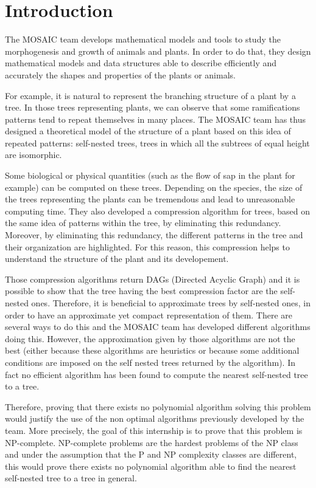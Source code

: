 \section*{Introduction}
%

The MOSAIC team develops mathematical models and tools to study the
morphogenesis and growth of animals and plants. In order to do that,
they design mathematical models and data structures able to describe
efficiently and accurately the shapes and properties of the plants or
animals.

For example, it is natural to represent the branching structure of a
plant by a tree. In those trees representing plants, we can observe
that some ramifications patterns tend to repeat themselves in many
places. The MOSAIC team has thus designed a theoretical model of the
structure of a plant based on this idea of repeated patterns:
self-nested trees, trees in which all the subtrees of equal height are
isomorphic.

Some biological or physical quantities (such as the flow of sap in the
plant for example) can be computed on these trees. Depending on the
species, the size of the trees representing the plants can be
tremendous and lead to unreasonable computing time. They also
developed a compression algorithm for trees, based on the same idea of
patterns within the tree, by eliminating this redundancy. Moreover, by
eliminating this redundancy, the different patterns in the tree and
their organization are highlighted. For this reason, this compression
helps to understand the structure of the plant and its developement.

Those compression algorithms return DAGs (Directed Acyclic Graph) and
it is possible to show that the tree having the best compression
factor are the self-nested ones. Therefore, it is beneficial to
approximate trees by self-nested ones, in order to have an approximate
yet compact representation of them. There are several ways to do this
and the MOSAIC team has developed different algorithms doing
this. However, the approximation given by those algorithms are not the
best (either because these algorithms are heuristics or because some
additional conditions are imposed on the self nested trees returned by
the algorithm). In fact no efficient algorithm has been found to
compute the nearest self-nested tree to a tree.

Therefore, proving that there exists no polynomial algorithm solving
this problem would justify the use of the non optimal algorithms
previously developed by the team. More precisely, the goal of this
internship is to prove that this problem is NP-complete. NP-complete
problems are the hardest problems of the NP class and under the
assumption that the P and NP complexity classes are different, this
would prove there exists no polynomial algorithm able to find the
nearest self-nested tree to a tree in general.

